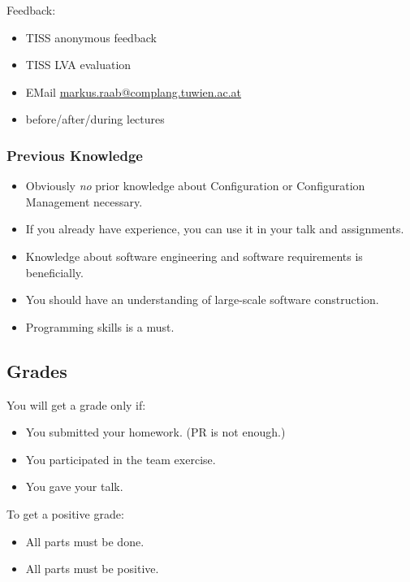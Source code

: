 \documentclass{beamer}
\begin{document}
\begin{frame}
	Feedback:
	\begin{itemize}
		\item TISS anonymous feedback
		\item TISS LVA evaluation
		\item EMail \url{markus.raab@complang.tuwien.ac.at}
		\item before/after/during lectures
	\end{itemize}
\end{frame}

\begin{frame}
	\frametitle{Previous Knowledge}
	\begin{itemize}
		\item Obviously \textit{no} prior knowledge about Configuration or Configuration Management necessary.
		\item If you already have experience, you can use it in your talk and assignments.
		\item Knowledge about software engineering and software requirements is beneficially.
		\item You should have an understanding of large-scale software construction.
		\item Programming skills is a must.
	\end{itemize}
\end{frame}

\subsection{Grades}
\begin{frame}
	You will get a grade only if:
	\begin{itemize}
		\item You submitted your homework. (PR is not enough.)
		\item You participated in the team exercise.
		\item You gave your talk.
	\end{itemize}
\end{frame}

\begin{frame}
	To get a positive grade:
	\begin{itemize}
		\item All parts must be done.
		\item All parts must be positive.
	\end{itemize}
\end{frame}
\end{document}
